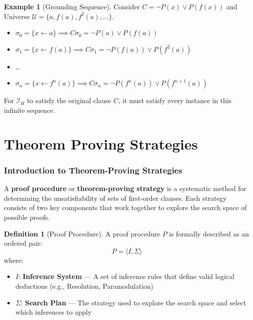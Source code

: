 \documentclass[11pt,a4paper]{article}
\theoremstyle{definition}
\newtheorem{definition}{Definition}[section]
\newtheorem{example}{Example}[section]
\theoremstyle{plain}
\theoremstyle{remark}
\begin{document}
\begin{example}[Grounding Sequence]

Consider $C = \neg P(x) \lor P(f(x))$ and Universe $\mathcal{U} = \{a, f(a), f^2(a), \dots\}$.

\begin{itemize}

    \item $\sigma_0 = \{x \leftarrow a\} \implies C\sigma_0 = \neg P(a) \lor P(f(a))$

    \item $\sigma_1 = \{x \leftarrow f(a)\} \implies C\sigma_1 = \neg P(f(a)) \lor P(f^2(a))$

    \item \dots

    \item $\sigma_n = \{x \leftarrow f^n(a)\} \implies C\sigma_n = \neg P(f^n(a)) \lor P(f^{n+1}(a))$

\end{itemize}

For $\mathcal{I}_H$ to satisfy the original clause $C$, it must satisfy every instance in this infinite sequence.

\end{example}



\newpage



\part{Theorem Proving Strategies}

\section{Introduction to Theorem-Proving Strategies}

A \textbf{proof procedure} or \textbf{theorem-proving strategy} is a systematic method for determining the unsatisfiability of sets of first-order clauses. Each strategy consists of two key components that work together to explore the search space of possible proofs.

\begin{tcolorbox}[colback=blue!5!white,colframe=blue!75!black,title=\textbf{Structure of a Proof Procedure}]
\begin{definition}[Proof Procedure]
A proof procedure $P$ is formally described as an ordered pair:
\[ P = \langle I, \Sigma \rangle \]
where:
\begin{itemize}
    \item $I$: \textbf{Inference System} --- A set of inference rules that define valid logical deductions (e.g., Resolution, Paramodulation)
    \item $\Sigma$: \textbf{Search Plan} --- The strategy used to explore the search space and select which inferences to apply
\end{itemize}
\end{definition}
\end{tcolorbox}
\end{document}
